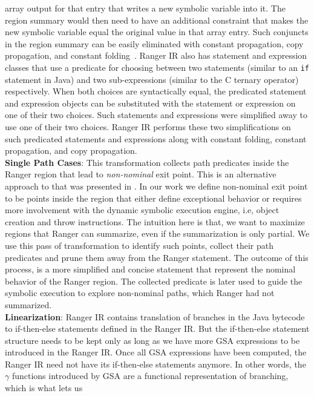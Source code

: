 array output for that entry that writes a new symbolic variable into it.
%
The region summary would then need to have an additional constraint that makes the new symbolic variable equal the
original value in that array entry.
%
Such conjuncts in the region summary can be easily eliminated with constant propagation, copy propagation, and constant
folding~\cite{dragon-book}.
%
Ranger IR also has statement and expression classes that use a predicate for choosing between two statements (similar to
an {\tt if} statement in Java) and two sub-expressions (similar to the C ternary operator) respectively.
%
When both choices are syntactically equal, the predicated statement and expression objects can be substituted with the
statement or expression on one of their two choices.
%
Such statements and expressions were simplified away to use one of their two choices.
%
Ranger IR performs these two simplifications on such predicated statements and expressions along with constant folding,
constant propagation, and copy propagation.\\
\textbf{Single Path Cases}: This transformation collects path predicates inside the Ranger region that lead to \textit{non-nominal} exit point.
%
This is an alternative approach to that was presented in \cite{veritesting}.
%
In our work we define non-nominal exit point to be points inside the region that either define exceptional behavior or requires more involvement with the dynamic symbolic execution engine, i.e, object creation and throw instructions.
%
The intuition here is that, we want to maximize regions that Ranger can summarize, even if the summarization is only partial.
%
We use this pass of transformation to identify such points, collect their path predicates and prune them away from the Ranger statement.
%
The outcome of this process, is a more simplified and concise statement that represent the nominal behavior of the Ranger region.
%
The collected predicate is later used to guide the symbolic execution to explore non-nominal paths, which Ranger had not summarized.  \\
%
\textbf{Linearization}:
Ranger IR contains translation of branches in the Java bytecode to if-then-else statements defined in the Ranger IR.
%
But the if-then-else statement structure needs to be kept only as long as we have more GSA expressions to be
introduced in the Ranger IR.
%
Once all GSA expressions have been computed, the Ranger IR need not have its if-then-else statements anymore.
%
In other words, the $\gamma$ functions introduced by GSA are a functional representation of branching, which is what lets us
